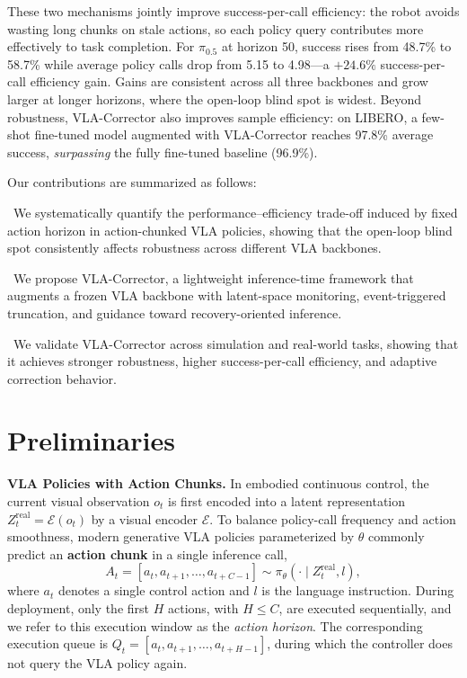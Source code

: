These two mechanisms jointly improve success-per-call efficiency: the robot avoids wasting long chunks on stale actions, so each policy query contributes more effectively to task completion. For $\pi_{0.5}$ at horizon 50, success rises from 48.7\% to 58.7\% while average policy calls drop from 5.15 to 4.98---a $+24.6\%$ success-per-call efficiency gain. Gains are consistent across all three backbones and grow larger at longer horizons, where the open-loop blind spot is widest. Beyond robustness, VLA-Corrector also improves sample efficiency: on LIBERO, a few-shot fine-tuned model augmented with VLA-Corrector reaches 97.8\% average success, \emph{surpassing} the fully fine-tuned baseline (96.9\%).

Our contributions are summarized as follows:

\textbullet~We systematically quantify the performance--efficiency trade-off induced by fixed action horizon in action-chunked VLA policies, showing that the open-loop blind spot consistently affects robustness across different VLA backbones.

\textbullet~We propose VLA-Corrector, a lightweight inference-time framework that augments a frozen VLA backbone with latent-space monitoring, event-triggered truncation, and guidance toward recovery-oriented inference.

\textbullet~We validate VLA-Corrector across simulation and real-world tasks, showing that it achieves stronger robustness, higher success-per-call efficiency, and adaptive correction behavior.



\section{Preliminaries}

\textbf{VLA Policies with Action Chunks.}
In embodied continuous control, the current visual observation $o_t$ is first encoded into a latent representation $Z_t^{\mathrm{real}} = \mathcal{E}(o_t)$ by a visual encoder $\mathcal{E}$. To balance policy-call frequency and action smoothness, modern generative VLA policies parameterized by $\theta$ commonly predict an \textbf{action chunk} in a single inference call,
\begin{equation}
A_t = [a_t, a_{t+1}, \dots, a_{t+C-1}] \sim \pi_\theta(\cdot \mid Z_t^{\mathrm{real}}, l),
\label{eq:action_chunk}
\end{equation}
where $a_t$ denotes a single control action and $l$ is the language instruction. During deployment, only the first $H$ actions, with $H \leq C$, are executed sequentially, and we refer to this execution window as the \emph{action horizon}. The corresponding execution queue is $Q_t = [a_t, a_{t+1}, \dots, a_{t+H-1}]$, during which the controller does not query the VLA policy again.

